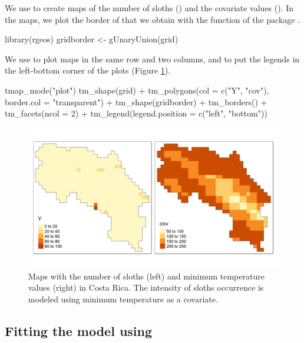
We use  to create maps of the number of sloths () and the covariate values ().
In the maps, we plot the border of  that we obtain with the  function of the  package \citep{Rrgeos}.

\begin{example}
library(rgeos)
gridborder <- gUnaryUnion(grid)
\end{example}

We use  to plot maps in the same row and two columns, and  to put the legends in the left-bottom corner of the plots (Figure \ref{fig:tmapYcov}).

\begin{example}
tmap_mode("plot")
tm_shape(grid) +
  tm_polygons(col = c("Y", "cov"), border.col = "transparent") +
  tm_shape(gridborder) + tm_borders() +
  tm_facets(ncol = 2) + tm_legend(legend.position = c("left", "bottom"))
\end{example}



\begin{figure}[htbp]
  \centering
  \includegraphics[width=.8\textwidth]{tmapYcov}
  \caption{Maps with the number of sloths (left) and minimum temperature values (right) in Costa Rica. The intensity of sloths occurrence is modeled using minimum temperature as a covariate.
}
  \label{fig:tmapYcov}
\end{figure}



\subsection{Fitting the model using }



